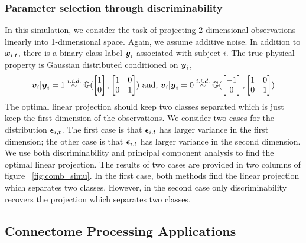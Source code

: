 \documentclass{article}
\begin{document}
\subsubsection{Parameter selection through discriminability  }
In this simulation, we consider the task of projecting 2-dimensional observations linearly into 1-dimensional space. Again, we assume additive noise. In addition to $\boldsymbol{x}_{i,t}$, there is a binary class label $\boldsymbol{y}_{i}$ associated with subject $i$. The true physical property is Gaussian distributed conditioned on $\boldsymbol{y}_i$,
\[\boldsymbol{v}_i|\boldsymbol{y}_i=1 \overset{i.i.d.}{\sim} \mathbb{G}(\begin{bmatrix}1\\0\end{bmatrix},\begin{bmatrix}1& 0\\0& 1\end{bmatrix}) \text{ and, } \boldsymbol{v}_i|\boldsymbol{y}_i=0 \overset{i.i.d.}{\sim} \mathbb{G}(\begin{bmatrix}-1\\0\end{bmatrix},\begin{bmatrix}1& 0\\0& 1\end{bmatrix}) \]
The optimal linear projection should keep two classes separated which is just keep the first dimension of the observations. We consider two cases for the distribution $\boldsymbol{\epsilon}_{i,t}$. The first case is that $\boldsymbol{\epsilon}_{i,t}$ has larger variance in the first dimension; the other case is that $\boldsymbol{\epsilon}_{i,t}$ has larger variance in the second dimension. We use both discriminability and principal component analysis \cite{jolliffe2002principal} to find the optimal linear projection. The results of two cases are provided in two columns of figure ~\ref{fig:comb_simu}. In the first case, both methods find the linear projection which separates two classes. However, in the second case only discriminability recovers the projection which separates two classes. 




\subsection{Connectome Processing Applications}
\end{document}
